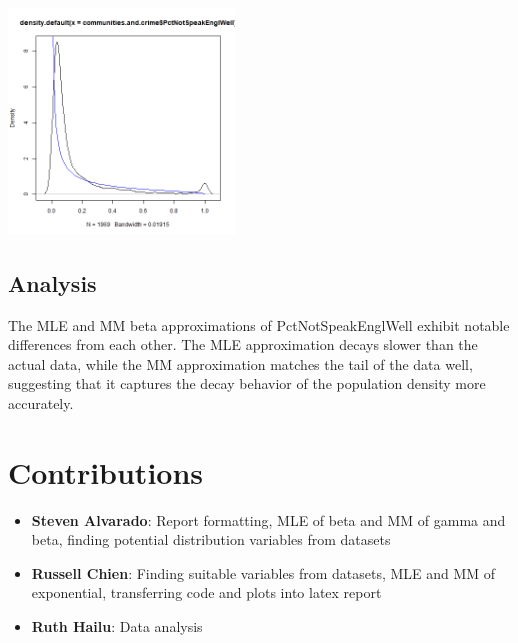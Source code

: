 \documentclass[12pt, letterpaper]{report}
\begin{document}
\begin{center}
\includegraphics[width=0.45\textwidth]{beta/PctNotSpeakEnglWell_mm}
\end{center}

\section{Analysis}
The MLE and MM beta approximations of PctNotSpeakEnglWell exhibit notable differences from each other.
The MLE approximation decays slower than the actual data, while the MM approximation matches the tail of the data well, suggesting that it captures the decay behavior of the population density more accurately.



\chapter{Contributions}
\begin{itemize}
 \item \textbf{Steven Alvarado}: Report formatting, MLE of beta and MM of gamma and beta, finding potential distribution variables from datasets
 \item \textbf{Russell Chien}: Finding suitable variables from datasets, MLE and MM of exponential, transferring code and plots into latex report
 \item \textbf{Ruth Hailu}: Data analysis
\end{itemize}
\end{document}
